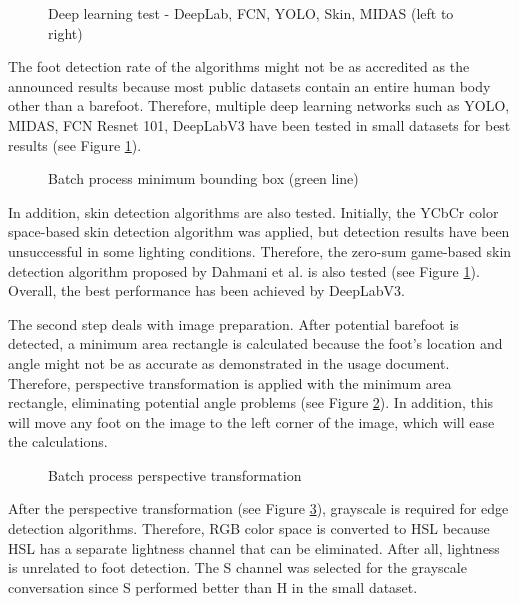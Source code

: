 \begin{figure}[htbp]
\centering
{}
\caption{Deep learning test - DeepLab, FCN, YOLO, Skin, MIDAS (left to right)}
\label{fig:DeepLearningTest}
\end{figure}

The foot detection rate of the algorithms might not be as accredited as the announced results because most public datasets contain an entire human body other than a barefoot. Therefore, multiple deep learning networks such as YOLO, MIDAS, FCN Resnet 101, DeepLabV3 have been tested in small datasets for best results (see Figure \ref{fig:DeepLearningTest}).

\begin{figure}[htbp]
\centering
{}
\caption{Batch process minimum bounding box (green line)}
\label{fig:BatchProcessMinimumBoundingBox}
\end{figure}

In addition, skin detection algorithms are also tested. Initially, the YCbCr color space-based skin detection algorithm was applied, but detection results have been unsuccessful in some lighting conditions. Therefore, the zero-sum game-based skin detection algorithm proposed by Dahmani et al. \cite{dahmani2020zero} is also tested (see Figure \ref{fig:DeepLearningTest}). Overall, the best performance has been achieved by DeepLabV3.

The second step deals with image preparation. After potential barefoot is detected, a minimum area rectangle is calculated because the foot's location and angle might not be as accurate as demonstrated in the usage document. Therefore, perspective transformation is applied with the minimum area rectangle, eliminating potential angle problems (see Figure \ref{fig:BatchProcessMinimumBoundingBox}). In addition, this will move any foot on the image to the left corner of the image, which will ease the calculations.

\begin{figure}[htbp]
\centering
{}
\caption{Batch process perspective transformation}
\label{fig:BatchProcessPerspectiveTransformation}
\end{figure}

After the perspective transformation (see Figure \ref{fig:BatchProcessPerspectiveTransformation}), grayscale is required for edge detection algorithms. Therefore, RGB color space is converted to HSL because HSL has a separate lightness channel that can be eliminated. After all, lightness is unrelated to foot detection. The S channel was selected for the grayscale conversation since S performed better than H in the small dataset.

